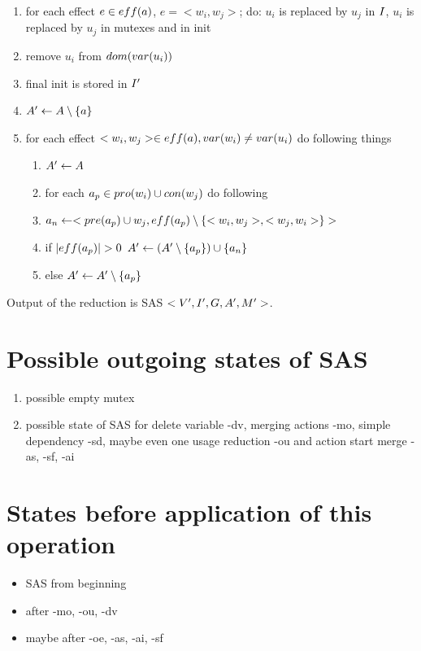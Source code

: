 	\begin{enumerate}
		\item for each effect $e \in eff(a)$, $e = <w_i, w_j>$; do: $u_i$ is replaced by $u_j$ in $I$, $u_i$ is replaced by $u_j$ in mutexes and in init
		\item remove $u_i$ from $dom(var(u_i))$
		\item final init is stored in $I{}'$
		\item $A{}' \leftarrow A \setminus \{a\}$
		\item for each effect $<w_i,w_j> \in eff(a), var(w_i) \neq var(u_i)$ do following things
		\begin{enumerate}
			\item $A{}'  \leftarrow A$
			\item for each $a_p \in pro(w_i) \cup con(w_j)$ do following
			\item $a_n \leftarrow <pre(a_p) \cup{w_j}, eff(a_p) \setminus \{<w_i,w_j>,<w_j,w_i>\} >$
			\item if $|eff(a_p)| > 0$ $A{}' \leftarrow (A{}' \setminus \{a_p\}) \cup \{a_n\}$
			\item else $A{}' \leftarrow A{}' \setminus \{a_p\}$ 
		\end{enumerate}
	\end{enumerate}
	
	Output of the reduction is SAS $<V{}', I{}', G{}, A{}', M{}'>$.
	
	
	\section{Possible outgoing states of SAS}
	\begin{enumerate}
		\item possible empty mutex
		\item possible state of SAS for delete variable -dv, merging actions -mo, simple dependency -sd, maybe even one usage reduction -ou and action start merge -as, -sf, -ai
	\end{enumerate}
	
	\section{States before application of this operation}
	\begin{itemize}
		\item SAS from beginning
		\item after -mo, -ou, -dv
		\item maybe after -oe, -as, -ai, -sf
	\end{itemize}
	
